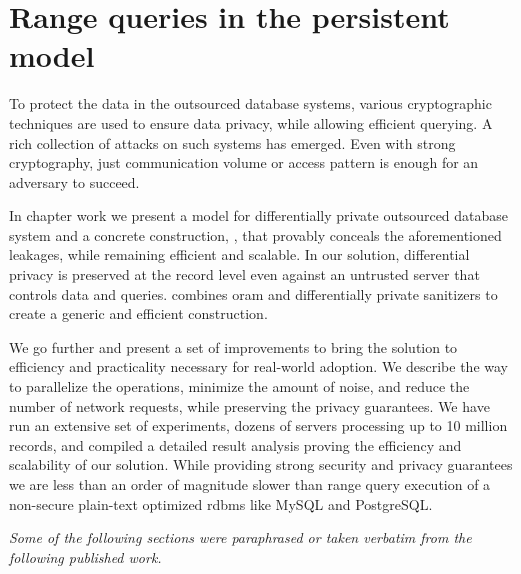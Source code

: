 \chapter{Range queries in the persistent model}\label{section:range-persistent}
\thispagestyle{myheadings}

	To protect the data in the outsourced database systems, various cryptographic techniques are used to ensure data privacy, while allowing efficient querying.
	A rich collection of attacks on such systems has emerged.
	Even with strong cryptography, just communication volume or access pattern is enough for an adversary to succeed.

	In chapter work we present a model for differentially private outsourced database system and a concrete construction, \epsolute{}, that provably conceals the aforementioned leakages, while remaining efficient and scalable.
	In our solution, differential privacy is preserved at the record level even against an untrusted server that controls data and queries.
	\epsolute{} combines \acrlong{oram} and differentially private sanitizers to create a generic and efficient construction.

	We go further and present a set of improvements to bring the solution to efficiency and practicality necessary for real-world adoption.
	We describe the way to parallelize the operations, minimize the amount of noise, and reduce the number of network requests, while preserving the privacy guarantees.
	We have run an extensive set of experiments, dozens of servers processing up to 10 million records, and compiled a detailed result analysis proving the efficiency and scalability of our solution.
	While providing strong security and privacy guarantees we are less than an order of magnitude slower than range query execution of a non-secure plain-text optimized \acrshort{rdbms} like MySQL and PostgreSQL\@.

	\emph{Some of the following sections were paraphrased or taken verbatim from the following published work.}

	\cite{epsolute} 

	
	
	
	
	
